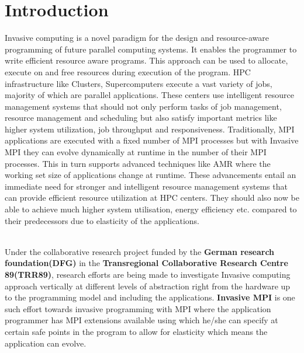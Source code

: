 \documentclass{article}
\begin{document}
\section{Introduction}
Invasive computing is a novel paradigm for the design and resource-aware programming of future parallel computing systems. It enables the programmer to write efficient resource aware programs. This approach can be used to allocate, execute on and free resources during execution of the program. HPC infrastructure like Clusters, Supercomputers execute a vast variety of jobs, majority of which are parallel applications. These centers use intelligent resource management systems that should not only perform tasks of job management, resource management and scheduling but also satisfy important metrics like higher system utilization, job throughput and responsiveness. Traditionally, MPI applications are executed with a fixed number of MPI processes but with Invasive MPI they can evolve dynamically at runtime in the number of their MPI processes. This in turn supports advanced techniques like AMR where the working set size of applications change at runtime. These advancements entail an immediate need for stronger and intelligent resource management systems that can provide efficient resource utilization at HPC centers. They should also now be able to achieve much higher system utilisation, energy efficiency etc. compared to their predecessors due to elasticity of the applications.\par 
\noindent
\\Under the collaborative research project funded by the \textbf{German research foundation(DFG)} in the \textbf{Transregional Collaborative Research Centre 89(TRR89)}, research efforts are being made to investigate Invasive computing approach vertically at different levels of abstraction right from the hardware up to the programming model and including the applications. \textbf{Invasive MPI} is one such effort towards invasive programming with MPI where the application programmer has MPI extensions available using which he/she can specify at certain safe points in the program to allow for elasticity which means the application can evolve.\par
 
\end{document}
